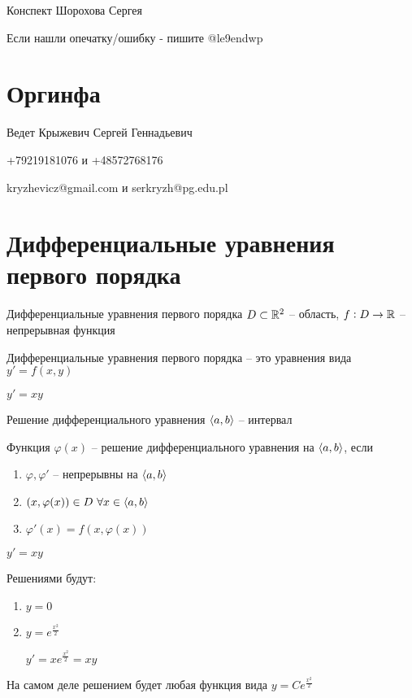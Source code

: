 \documentclass[12pt]{article}
\begin{document}
\begin{flushright}
    Конспект Шорохова Сергея

    Если нашли опечатку/ошибку - пишите @le9endwp 
\end{flushright}

\tableofcontents
\newpage

\section{Оргинфа}

Ведет Крыжевич Сергей Геннадьевич

+79219181076 и +48572768176

kryzhevicz@gmail.com и serkryzh@pg.edu.pl

\section{Дифференциальные уравнения первого порядка}

\begin{defin}{Дифференциальные уравнения первого порядка}
    $D \subset \mathbb R^2$ -- область, $f : D \to \mathbb R$ -- непрерывная функция

    Дифференциальные уравнения первого порядка -- это уравнения вида $y' = f(x, y)$
\end{defin}

\begin{Example}{}
    $y' = xy$
\end{Example}

\begin{defin}{Решение дифференциального уравнения}
    $\langle a, b \rangle$ -- интервал

    Функция $\varphi(x)$ -- решение дифференциального уравнения на $\langle a, b \rangle$, если 

    \begin{enumerate}
        \item $\varphi, \varphi'$ -- непрерывны на $\langle a, b \rangle$
        \item $(x, \varphi(x)) \in D\ \forall x \in \langle a, b \rangle$
        \item $\varphi'(x) = f(x, \varphi(x))$
    \end{enumerate}
\end{defin}

\begin{Example}{}
    $y' = xy$

    Решениями будут:

    \begin{enumerate}
        \item $y = 0$
        \item $y = e^{\frac{x^2}{2}}$
        
        $y' = xe^{\frac{x^2}{2}} = xy$
    \end{enumerate}

    На самом деле решением будет любая функция вида $y = Ce^{\frac{x^2}{2}}$
\end{Example}
\end{document}
